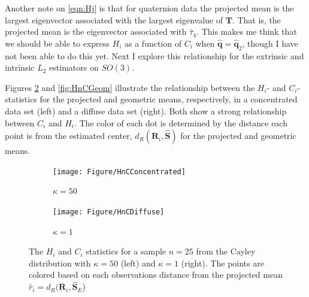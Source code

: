 \documentclass{article}\usepackage{graphicx, color}
\newcommand{\ProjMean}{{\widehat{\bm S}_{E}}}
\newcommand{\qest}{{\hat{\bm q}}}
\newcommand{\Sest}{{\widehat{\bm S}}}
\begin{document}
Another note on \eqref{eqn:Hj} is that for quaternion data the projected mean is the largest eigenvector associated with the largest eigenvalue of $\bm T$.  That is, the projected mean is the eigenvector associated with $\hat\tau_4$.  This makes me think that we should be able to express $H_i$ as a function of $C_i$ when $\qest=\hat{\bm q}_2$, though I have not been able to do this yet.  Next I explore this relationship for the extrinsic and intrinsic $L_2$ estimators on $SO(3)$. 


Figures \ref{fig:HnC} and \ref{fig:HnCGeom} illustrate the relationship between the $H_i$- and $C_i$-statistics for the projected and geometric means, respectively, in a concentrated data set (left) and a diffuse data set (right).  Both show a strong relationship between $C_i$ and $H_i$.  The color of each dot is determined by the distance each point is from the estimated center, $d_R(\bm R_i,\Sest)$ for the projected and geometric means.

\begin{figure}
\centering
\begin{subfigure}[b]{0.45\textwidth}
        \texttt{[image: Figure/HnCConcentrated]}
        \caption{$\kappa=50$}
\end{subfigure}
\begin{subfigure}[b]{0.45\textwidth}
        \texttt{[image: Figure/HnCDiffuse]}
        \caption{$\kappa=1$}
        \label{fig:HnDiff}
\end{subfigure}
\caption{The $H_i$ and $C_i$ statistics for a sample $n=25$ from the Cayley distribution with $\kappa=50$ (left) and $\kappa=1$ (right).  The points are colored based on each observations distance from the projected mean $\hat r_i=d_R(\bm R_i,\ProjMean$)}
\label{fig:HnC}
\end{figure}
\end{document}
